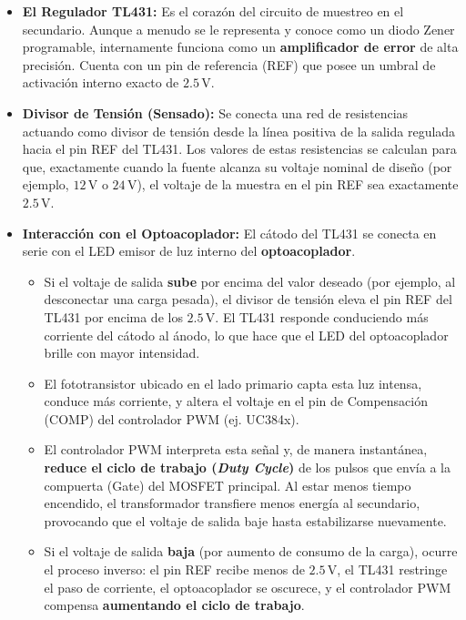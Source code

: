 \documentclass[12pt, a4paper]{article}
\begin{document}
\begin{itemize}[itemsep=1.5ex]
    \item \textbf{El Regulador TL431:} Es el corazón del circuito de muestreo en el secundario. Aunque a menudo se le representa y conoce como un diodo Zener programable, internamente funciona como un \textbf{amplificador de error} de alta precisión. Cuenta con un pin de referencia (REF) que posee un umbral de activación interno exacto de $2.5\,\text{V}$. 
    
    \item \textbf{Divisor de Tensión (Sensado):} Se conecta una red de resistencias actuando como divisor de tensión desde la línea positiva de la salida regulada hacia el pin REF del TL431. Los valores de estas resistencias se calculan para que, exactamente cuando la fuente alcanza su voltaje nominal de diseño (por ejemplo, $12\,\text{V}$ o $24\,\text{V}$), el voltaje de la muestra en el pin REF sea exactamente $2.5\,\text{V}$.
    
    \item \textbf{Interacción con el Optoacoplador:} El cátodo del TL431 se conecta en serie con el LED emisor de luz interno del \textbf{optoacoplador}. 
    \begin{itemize}[itemsep=1ex, topsep=1ex]
        \item Si el voltaje de salida \textbf{sube} por encima del valor deseado (por ejemplo, al desconectar una carga pesada), el divisor de tensión eleva el pin REF del TL431 por encima de los $2.5\,\text{V}$. El TL431 responde conduciendo más corriente del cátodo al ánodo, lo que hace que el LED del optoacoplador brille con mayor intensidad.
        \item El fototransistor ubicado en el lado primario capta esta luz intensa, conduce más corriente, y altera el voltaje en el pin de Compensación (COMP) del controlador PWM (ej. UC384x).
        \item El controlador PWM interpreta esta señal y, de manera instantánea, \textbf{reduce el ciclo de trabajo (\textit{Duty Cycle})} de los pulsos que envía a la compuerta (Gate) del MOSFET principal. Al estar menos tiempo encendido, el transformador transfiere menos energía al secundario, provocando que el voltaje de salida baje hasta estabilizarse nuevamente.
        \item Si el voltaje de salida \textbf{baja} (por aumento de consumo de la carga), ocurre el proceso inverso: el pin REF recibe menos de $2.5\,\text{V}$, el TL431 restringe el paso de corriente, el optoacoplador se oscurece, y el controlador PWM compensa \textbf{aumentando el ciclo de trabajo}.
    \end{itemize}
\end{itemize}
\end{document}

